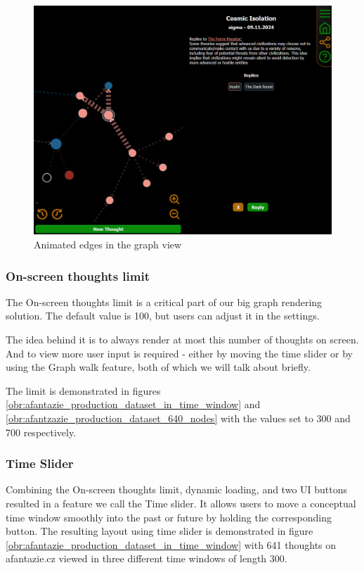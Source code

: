 \begin{figure}[p]
    \includegraphics[width=130mm, keepaspectratio]{img/afantazie_animated_edges.png}
    \caption{Animated edges in the graph view}
    \label{obr:afantazie_animated_edges}
\end{figure}
    
\subsubsection*{On-screen thoughts limit}
The On-screen thoughts limit is a critical part of our big graph rendering solution.
The default value is 100, but users can adjust it in the settings.

The idea behind it is to always render at most this number of thoughts on screen.
And to view more user input is required - either by moving the time slider or by using the Graph walk feature, both of which we will talk about briefly.

The limit is demonstrated in figures \ref{obr:afantazie_production_dataset_in_time_window} and \ref{obr:afantzazie_production_dataset_640_nodes} with the values set to 300 and 700 respectively.

\subsubsection*{Time Slider}
Combining the On-screen thoughts limit, dynamic loading, and two UI buttons resulted in a feature we call the Time slider.
It allows users to move a conceptual time window smoothly into the past or future by holding the corresponding button.
The resulting layout using time slider is demonstrated in figure \ref{obr:afantazie_production_dataset_in_time_window}
with 641 thoughts on afantazie.cz viewed in three different time windows of length 300.

